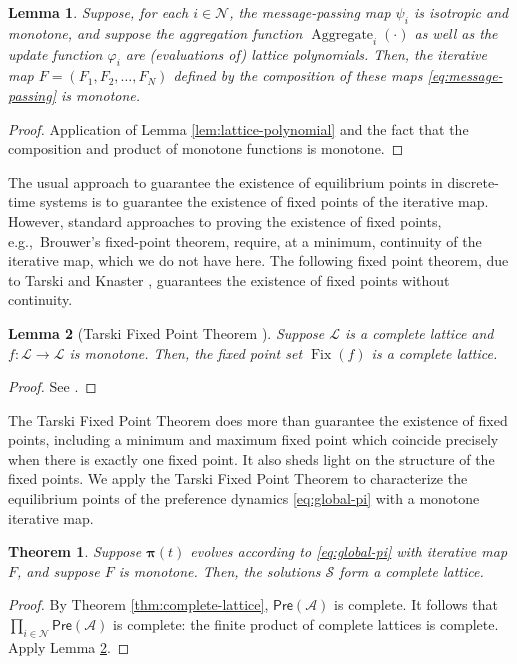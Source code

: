 \documentclass[conference]{ieeeconf}
\newcommand{\N}{\mathcal{N}}
\newcommand{\A}{\mathcal{A}}
\renewcommand{\SS}{\mathcal{S}}
\newcommand{\Pref}{\mathsf{Pre}}
\renewcommand{\L}{\mathcal{L}}
\newcommand{\profile}{\boldsymbol{\pi}}
\DeclareMathOperator{\Fix}{Fix}
\DeclareMathOperator{\Aggregate}{Aggregate}
\newtheorem{theorem}{Theorem}
\newtheorem{lemma}{Lemma}
\begin{document}
\begin{lemma} \label{lem:message-passing}
    Suppose, for each $i \in \N$, the message-passing map $\psi_i$ is isotropic and monotone, and suppose the aggregation function $\Aggregate_i(\cdot)$ as well as the update function $\varphi_i$ are (evaluations of) lattice polynomials. Then, the iterative map $F = (F_1,F_2,\dots,F_N)$ defined by the composition of these maps \eqref{eq:message-passing} is monotone.
\end{lemma}
\begin{proof}
    Application of Lemma \ref{lem:lattice-polynomial} and the fact that the composition and product of monotone functions is monotone.
\end{proof}

The usual approach to guarantee the existence of equilibrium points in discrete-time systems is to guarantee the existence of fixed points of the iterative map. However, standard approaches to proving the existence of fixed points, e.g.,~Brouwer's fixed-point theorem, require, at a minimum, continuity of the iterative map, which we do not have here. The following fixed point theorem, due to Tarski \cite{tarski1941} and Knaster \cite{knaster1928}, guarantees the existence of fixed points without continuity.

\begin{lemma}[Tarski Fixed Point Theorem \cite{tarski1955}] \label{lem:tfpt}
    Suppose $\L$ is a complete lattice and $f: \L \to \L$ is monotone. Then, the fixed point set $\Fix(f)$ is a complete lattice.
\end{lemma}
\begin{proof}
    See \cite[Theorem 12.2]{roman2008}. 
\end{proof}

The Tarski Fixed Point Theorem does more than guarantee the existence of fixed points, including a minimum and maximum fixed point which coincide precisely when there is exactly one fixed point. It also sheds light on the structure of the fixed points. We apply the Tarski Fixed Point Theorem to characterize the equilibrium points of the preference dynamics \eqref{eq:global-pi} with a monotone iterative map.

\begin{theorem} \label{thm:dynamics}
    Suppose $\profile(t)$ evolves according to \eqref{eq:global-pi} with iterative map $F$, and suppose $F$ is monotone. Then, the solutions $\SS$ form a complete lattice.
\end{theorem}
\begin{proof}
    By Theorem \ref{thm:complete-lattice}, $\Pref(\A)$ is complete. It follows that $\prod_{i \in \N}  \Pref(\A)$ is complete: the finite product of complete lattices is complete. Apply Lemma \ref{lem:tfpt}.
\end{proof}
\end{document}
